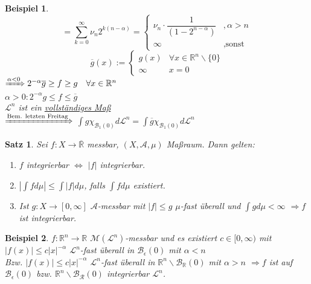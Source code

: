 \documentclass[11pt]{memoir}
\theoremstyle{changebreak}
\newtheorem{Beispiel}{Beispiel}[chapter]
\newtheorem{Satz}{Satz}[chapter]
\begin{document}
\begin{Beispiel}
\begin{equation}
= \sum\limits_{k=0}^\infty  \nu_n 2^{k(n-\alpha)} =
\begin{cases}
	\nu_n \cdotp \dfrac{1}{(1-2^{n-\alpha})} & , \alpha > n \\
	\infty & , \text{sonst}
\end{cases}
\end{equation}
\begin{equation}
\overline{g}(x) :=
\begin{cases}
	g(x) & \forall x \in \mathbb R^n \backslash \{0\} \\
	\infty & x = 0
\end{cases}
\end{equation}
$\xRightarrow{\alpha < 0} 2^{-\alpha}\overline{g} \geq f \geq g\quad \forall x \in \mathbb R^n$ \\
$\alpha > 0: 2^{-\alpha}g \leq f \leq \overline g$ \\
$\mathscr L^n$ ist ein \underline{vollständiges Maß} \\
$\xRightarrow{\text{Bem. letzten Freitag}}$ $\int g \chi_{\mathscr B_1 (0)} d\mathscr L^n = \int \overline g \chi_{\mathscr B_1(0)} d\mathscr L^n$
\end{Beispiel}

\begin{Satz}
Sei $f: X \rightarrow \overline{\mathbb R}$ messbar, $(X, \mathscr A, \mu)$ Maßraum. Dann gelten:
\begin{enumerate}
	\item $f$ integrierbar $\Leftrightarrow$ $|f|$ integrierbar.
	\item $\left| \int f d\mu \right| \leq \int |f| d\mu$, falls $\int f d\mu$ existiert.
	\item Ist $g: X \rightarrow [0, \infty]$ $\mathscr A$-messbar mit $|f| \leq g$ $\mu$-fast überall und $\int g d\mu < \infty$ $\Rightarrow f$ ist integrierbar.
\end{enumerate}
\end{Satz}

\begin{Beispiel}
$f: \mathbb R^n \rightarrow \mathbb R$ $\mathscr M(\mathscr L^n)$-messbar und es existiert $c \in [0, \infty)$ mit $|f(x)| \leq c|x|^{-\alpha}$ $\mathscr L^n$-fast überall in $\mathscr B_\epsilon (0)$ mit $\alpha < n$ \\
Bzw. $|f(x)| \leq c|x|^{-\alpha}$ $\mathscr L^n$-fast überall in $\mathbb R^n \backslash \mathscr B_\mathbb R (0)$ mit $\alpha > n$ $\Rightarrow f$ ist auf $\mathscr B_\epsilon (0)$ bzw. $\mathbb R^n \backslash \mathscr B_\mathscr R (0)$ integrierbar $\mathscr L^n$.
\end{Beispiel}
\end{document}

